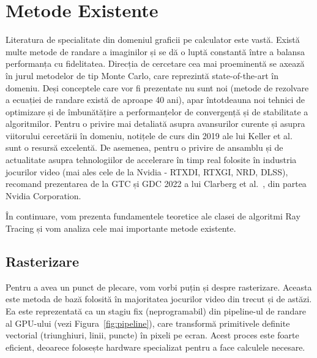 \documentclass[12pt,a4paper]{report}
\numberwithin{equation}{section} %
\begin{document}
\chapter{\label{sec:stateoftheart}Metode Existente}

Literatura de specialitate din domeniul graficii pe calculator este vastă. Există
multe metode de randare a imaginilor și se dă o luptă constantă între a balansa
performanța cu fidelitatea. Direcția de cercetare cea mai proeminentă se axează
în jurul metodelor de tip Monte Carlo, care reprezintă state-of-the-art în
domeniu. Deși conceptele care vor fi prezentate nu sunt noi (metode de rezolvare
a ecuației de randare există de aproape 40 ani), apar întotdeauna noi tehnici
de optimizare și de îmbunătățire a performanțelor de convergență și de stabilitate
a algoritmilor. Pentru o privire mai detaliată asupra avansurilor curente și asupra
viitorului cercetării în domeniu, notițele de curs din 2019 ale lui Keller et al.~\cite{Keller}
sunt o resursă excelentă. De asemenea, pentru o privire de ansamblu și de actualitate asupra tehnologiilor
de accelerare în timp real folosite în industria jocurilor video (mai ales cele de la Nvidia - RTXDI, RTXGI, NRD, DLSS), recomand prezentarea
de la GTC și GDC 2022 a lui Clarberg et al.~\cite{Clarberg2022}, din partea Nvidia Corporation.

În continuare, vom prezenta fundamentele teoretice ale clasei de
algoritmi Ray Tracing și vom analiza cele mai importante metode existente.

\section{Rasterizare}

Pentru a avea un punct de plecare, vom vorbi puțin și despre rasterizare.
Aceasta este metoda de bază folosită în majoritatea jocurilor video din trecut și
de astăzi. Ea este reprezentată ca un stagiu fix (neprogramabil) din pipeline-ul
de randare al GPU-ului (vezi Figura~\ref{fig:pipeline}), care transformă primitivele definite vectorial (triunghiuri,
linii, puncte) în pixeli pe ecran. Acest proces este foarte eficient, deoarece
folosește hardware specializat pentru a face calculele necesare.
\end{document}
